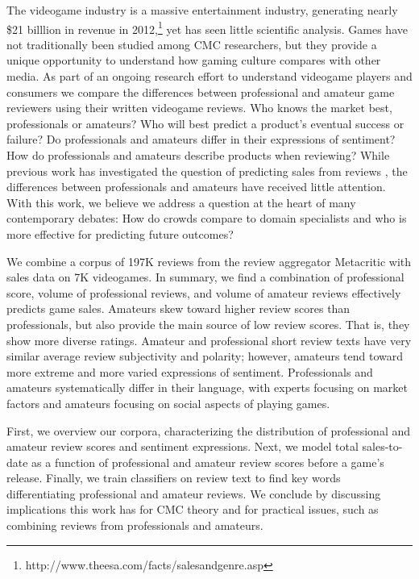 \documentclass{sig-alternate}
\begin{document}
The videogame industry is a massive entertainment industry, generating nearly \$21 billlion in revenue in 2012,\footnote{http://www.theesa.com/facts/salesandgenre.asp} yet has seen little scientific analysis.
Games have not traditionally been studied among CMC researchers, but they provide a unique opportunity to understand how gaming culture compares with other media.
As part of an ongoing research effort to understand videogame players and consumers we compare the differences between professional and amateur game reviewers using their written videogame reviews. 
Who knows the market best, professionals or amateurs? Who will best predict a
product's eventual success or failure? Do professionals and amateurs
differ in their expressions of sentiment? How do professionals and
amateurs describe products when reviewing? While previous work has
investigated the question of predicting sales from reviews
\cite{chevalier2003effect, dellarocas2007exploring, duan2008online, forman2008examining, gruhl2005predictive, liu2001word, yu2012mining},
the differences between professionals and amateurs have received little
attention. With this work, we believe we address a question at the heart
of many contemporary debates: How do crowds compare to domain
specialists and who is more effective for predicting future outcomes?

We combine a corpus of 197K reviews from 
the review aggregator Metacritic with sales data on 7K videogames. In summary, we find a
combination of professional score, volume of professional reviews,
and volume of amateur reviews effectively predicts game sales. Amateurs
skew toward higher review scores than professionals, but also
provide the main source of low review scores. That is, they show more
diverse ratings. 
Amateur and professional short review texts have very similar 
average review subjectivity and polarity; however, amateurs tend toward
more extreme and more varied expressions of sentiment. 
Professionals and amateurs systematically differ in their language, with
experts focusing on market factors and amateurs focusing on
social aspects of playing games.

First, we overview our corpora, characterizing the
distribution of professional and amateur review scores and sentiment
expressions. Next, we model total sales-to-date as a function of 
professional and amateur review scores before a game's release. Finally,
we train classifiers on review text to find key words differentiating
professional and amateur reviews. We conclude by discussing
implications this work has for CMC theory and for practical
issues, such as combining reviews from professionals and amateurs.
\end{document}
